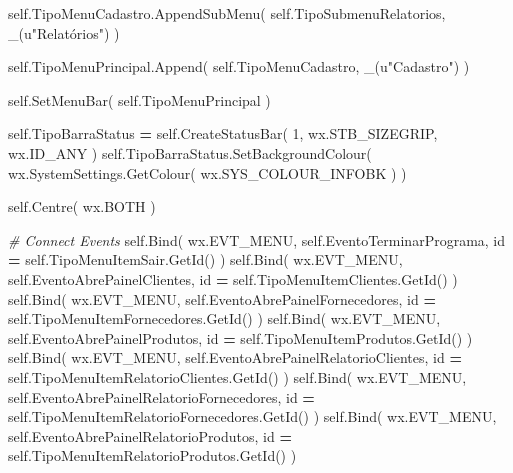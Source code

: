 \documentclass[
]{book}
\newenvironment{Shaded}{\begin{snugshade}}{\end{snugshade}}
\newcommand{\BuiltInTok}[1]{#1}
\newcommand{\CommentTok}[1]{\textcolor[rgb]{0.56,0.35,0.01}{\textit{#1}}}
\newcommand{\DecValTok}[1]{\textcolor[rgb]{0.00,0.00,0.81}{#1}}
\newcommand{\NormalTok}[1]{#1}
\newcommand{\OperatorTok}[1]{\textcolor[rgb]{0.81,0.36,0.00}{\textbf{#1}}}
\newcommand{\StringTok}[1]{\textcolor[rgb]{0.31,0.60,0.02}{#1}}
\newcommand{\VariableTok}[1]{\textcolor[rgb]{0.00,0.00,0.00}{#1}}
\begin{document}
\begin{Shaded}
\begin{Highlighting}[]
       \VariableTok{self}\NormalTok{.TipoMenuCadastro.AppendSubMenu( }\VariableTok{self}\NormalTok{.TipoSubmenuRelatorios, \_(}\StringTok{u"Relatórios"}\NormalTok{) )}

       \VariableTok{self}\NormalTok{.TipoMenuPrincipal.Append( }\VariableTok{self}\NormalTok{.TipoMenuCadastro, \_(}\StringTok{u"Cadastro"}\NormalTok{) )}

       \VariableTok{self}\NormalTok{.SetMenuBar( }\VariableTok{self}\NormalTok{.TipoMenuPrincipal )}

       \VariableTok{self}\NormalTok{.TipoBarraStatus }\OperatorTok{=} \VariableTok{self}\NormalTok{.CreateStatusBar( }\DecValTok{1}\NormalTok{, wx.STB\_SIZEGRIP, wx.ID\_ANY )}
       \VariableTok{self}\NormalTok{.TipoBarraStatus.SetBackgroundColour( wx.SystemSettings.GetColour( wx.SYS\_COLOUR\_INFOBK ) )}


       \VariableTok{self}\NormalTok{.Centre( wx.BOTH )}

       \CommentTok{\# Connect Events}
       \VariableTok{self}\NormalTok{.Bind( wx.EVT\_MENU, }\VariableTok{self}\NormalTok{.EventoTerminarPrograma,                }\BuiltInTok{id} \OperatorTok{=} \VariableTok{self}\NormalTok{.TipoMenuItemSair.GetId()                  )}
       \VariableTok{self}\NormalTok{.Bind( wx.EVT\_MENU, }\VariableTok{self}\NormalTok{.EventoAbrePainelClientes,              }\BuiltInTok{id} \OperatorTok{=} \VariableTok{self}\NormalTok{.TipoMenuItemClientes.GetId()              )}
       \VariableTok{self}\NormalTok{.Bind( wx.EVT\_MENU, }\VariableTok{self}\NormalTok{.EventoAbrePainelFornecedores,          }\BuiltInTok{id} \OperatorTok{=} \VariableTok{self}\NormalTok{.TipoMenuItemFornecedores.GetId()          )}
       \VariableTok{self}\NormalTok{.Bind( wx.EVT\_MENU, }\VariableTok{self}\NormalTok{.EventoAbrePainelProdutos,              }\BuiltInTok{id} \OperatorTok{=} \VariableTok{self}\NormalTok{.TipoMenuItemProdutos.GetId()              )}
       \VariableTok{self}\NormalTok{.Bind( wx.EVT\_MENU, }\VariableTok{self}\NormalTok{.EventoAbrePainelRelatorioClientes,     }\BuiltInTok{id} \OperatorTok{=} \VariableTok{self}\NormalTok{.TipoMenuItemRelatorioClientes.GetId()     )}
       \VariableTok{self}\NormalTok{.Bind( wx.EVT\_MENU, }\VariableTok{self}\NormalTok{.EventoAbrePainelRelatorioFornecedores, }\BuiltInTok{id} \OperatorTok{=} \VariableTok{self}\NormalTok{.TipoMenuItemRelatorioFornecedores.GetId() )}
       \VariableTok{self}\NormalTok{.Bind( wx.EVT\_MENU, }\VariableTok{self}\NormalTok{.EventoAbrePainelRelatorioProdutos,     }\BuiltInTok{id} \OperatorTok{=} \VariableTok{self}\NormalTok{.TipoMenuItemRelatorioProdutos.GetId()     )}


\end{Highlighting}
\end{Shaded}
\end{document}
